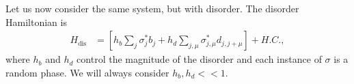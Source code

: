 \documentclass[pra,aps,twocolumn, amsfonts,amsmath,amssymb,nofootinbib,superscriptaddress]{revtex4-2}
\newcommand{\todo}[1]{\textcolor{orange}{#1}}
\begin{document}

Let us now consider the same system, but with disorder.  The disorder Hamiltonian is
\begin{align}
H_\text{dis} &= \left[h_b\sum_j \sigma^*_jb_j + h_d \sum_{j,\mu} \sigma^*_{j,\mu}d_{j,j+\mu}\right] + H.C.,
\end{align}
where $h_b$ and $h_d$ control the magnitude of the disorder and each instance of $\sigma$ is a random phase. We will always consider $h_b,h_d<<1$.


\end{document}
